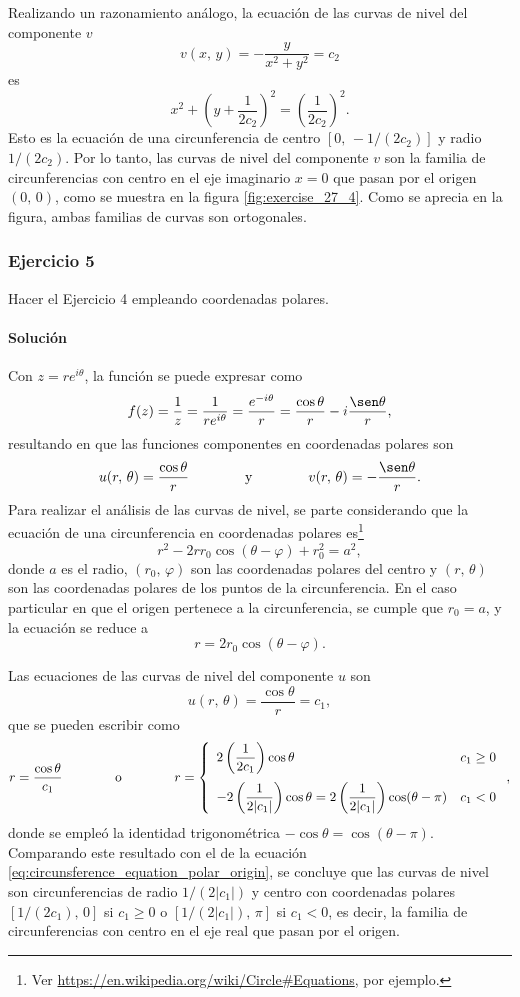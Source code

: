 \documentclass[a4paper]{report}
\begin{document}
Realizando un razonamiento análogo, la ecuación de las curvas de nivel del componente \(v\) 
\[
 v(x,\,y)=-\frac{y}{x^2+y^2}=c_2
\]
es
\[
 x^2+\left(y+\frac{1}{2c_2}\right)^2=\left(\frac{1}{2c_2}\right)^2.
\]
Esto es la ecuación de una circunferencia de centro \([0,\,-1/(2c_2)]\) y radio \(1/(2c_2)\). Por lo tanto, las curvas de nivel del componente \(v\) son la familia de circunferencias con centro en el eje imaginario \(x=0\) que pasan por el origen \((0,\,0)\), como se muestra en la figura \ref{fig:exercise_27_4}. Como se aprecia en la figura, ambas familias de curvas son ortogonales.

\subsubsection{Ejercicio 5}

Hacer el Ejercicio 4 empleando coordenadas polares. 

\paragraph{Solución} Con \(z=re^{i\theta}\), la función se puede expresar como
\[
 f(z)=\frac{1}{z}=\frac{1}{re^{i\theta}}=\frac{e^{-i\theta}}{r}=\frac{\cos\theta}{r}-i\frac{\sen\theta}{r},
\]
resultando en que las funciones componentes en coordenadas polares son
\[
 u(r,\,\theta)=\frac{\cos\theta}{r}
 \qquad\qquad\textrm{y}\qquad\qquad
 v(r,\,\theta)=-\frac{\sen\theta}{r}.
\]
Para realizar el análisis de las curvas de nivel, se parte considerando que la ecuación de una circunferencia en coordenadas polares es\footnote{Ver \url{https://en.wikipedia.org/wiki/Circle\#Equations}, por ejemplo.}
\[
 r^2-2rr_0\cos(\theta-\varphi)+r_0^2=a^2,
\]
donde \(a\) es el radio, \((r_0,\,\varphi)\) son las coordenadas polares del centro y \((r,\,\theta)\) son las coordenadas polares de los puntos de la circunferencia. En el caso particular en que el origen pertenece a la circunferencia, se cumple que \(r_0=a\), y la ecuación se reduce a
\begin{equation}\label{eq:circunsference_equation_polar_origin}
 r=2r_0\cos(\theta-\varphi).
\end{equation}

Las ecuaciones de las curvas de nivel del componente \(u\) son
\[
 u(r,\,\theta)=\frac{\cos\theta}{r}=c_1,
\]
que se pueden escribir como
\[
 r=\frac{\cos\theta}{c_1}
 \qquad\qquad\textrm{o}\qquad\qquad
 r=\left\{ 
 \begin{array}{ll}
  2\left(\dfrac{1}{2c_1}\right)\cos\theta & c_1\geq0\\[\bigskipamount]
  -2\left(\dfrac{1}{2|c_1|}\right)\cos\theta=2\left(\dfrac{1}{2|c_1|}\right)\cos(\theta-\pi) & c_1<0
 \end{array}
 \right.,
\]
donde se empleó la identidad trigonométrica \(-\cos\theta=\cos(\theta-\pi)\).
Comparando este resultado con el de la ecuación \ref{eq:circunsference_equation_polar_origin}, se concluye que las curvas de nivel son circunferencias de radio \(1/(2|c_1|)\) y centro con coordenadas polares \([1/(2c_1),\,0]\) si \(c_1\geq0\) o \([1/(2|c_1|),\,\pi]\) si \(c_1<0\), es decir, la familia de circunferencias con centro en el eje real que pasan por el origen.
\end{document}
